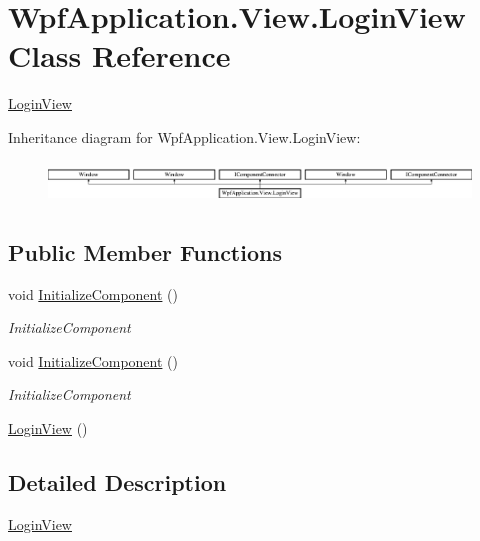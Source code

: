 \hypertarget{class_wpf_application_1_1_view_1_1_login_view}{\section{Wpf\-Application.\-View.\-Login\-View Class Reference}
\label{class_wpf_application_1_1_view_1_1_login_view}
}


\hyperlink{class_wpf_application_1_1_view_1_1_login_view}{Login\-View}  


Inheritance diagram for Wpf\-Application.\-View.\-Login\-View\-:\begin{figure}[H]
\begin{center}
\leavevmode
\includegraphics[height=1.120000cm]{class_wpf_application_1_1_view_1_1_login_view}
\end{center}
\end{figure}
\subsection*{Public Member Functions}
\begin{DoxyCompactItemize}
\item 
void \hyperlink{class_wpf_application_1_1_view_1_1_login_view_a93058e3538e875f4ebf62821e8b68eb6}{Initialize\-Component} ()
\begin{DoxyCompactList}\small\item\em Initialize\-Component \end{DoxyCompactList}\item 
void \hyperlink{class_wpf_application_1_1_view_1_1_login_view_a93058e3538e875f4ebf62821e8b68eb6}{Initialize\-Component} ()
\begin{DoxyCompactList}\small\item\em Initialize\-Component \end{DoxyCompactList}\item 
\hyperlink{class_wpf_application_1_1_view_1_1_login_view_a080dda3e07f2d5814f7fc6fc484cb1e1}{Login\-View} ()
\end{DoxyCompactItemize}


\subsection{Detailed Description}
\hyperlink{class_wpf_application_1_1_view_1_1_login_view}{Login\-View} 

